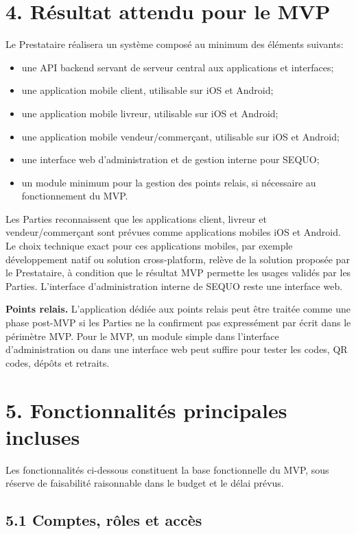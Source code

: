 \documentclass[11pt,a4paper]{article}
\begin{document}
\section*{4. Résultat attendu pour le MVP}

Le Prestataire réalisera un système composé au minimum des éléments suivants:

\begin{itemize}
    \item une API backend servant de serveur central aux applications et interfaces;
    \item une application mobile client, utilisable sur iOS et Android;
    \item une application mobile livreur, utilisable sur iOS et Android;
    \item une application mobile vendeur/commerçant, utilisable sur iOS et Android;
    \item une interface web d'administration et de gestion interne pour SEQUO;
    \item un module minimum pour la gestion des points relais, si nécessaire au fonctionnement du MVP.
\end{itemize}

Les Parties reconnaissent que les applications client, livreur et vendeur/commerçant sont prévues comme applications mobiles iOS et Android. Le choix technique exact pour ces applications mobiles, par exemple développement natif ou solution cross-platform, relève de la solution proposée par le Prestataire, à condition que le résultat MVP permette les usages validés par les Parties. L'interface d'administration interne de SEQUO reste une interface web.

\textbf{Points relais.} L'application dédiée aux points relais peut être traitée comme une phase post-MVP si les Parties ne la confirment pas expressément par écrit dans le périmètre MVP. Pour le MVP, un module simple dans l'interface d'administration ou dans une interface web peut suffire pour tester les codes, QR codes, dépôts et retraits.

\section*{5. Fonctionnalités principales incluses}

Les fonctionnalités ci-dessous constituent la base fonctionnelle du MVP, sous réserve de faisabilité raisonnable dans le budget et le délai prévus.

\subsection*{5.1 Comptes, rôles et accès}
\end{document}
